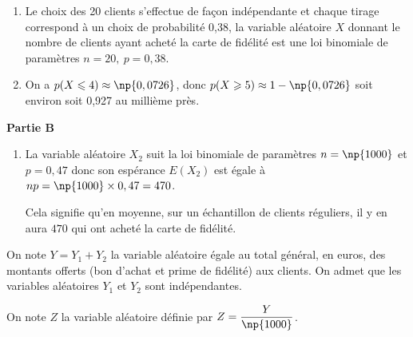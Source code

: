 \begin{enumerate}
	\begin{enumerate}
		\item 
	Le choix des 20 clients s'effectue de façon indépendante  et chaque tirage correspond à un choix de probabilité 0,38, la variable aléatoire $X$ donnant le nombre de clients ayant acheté la carte de fidélité est une loi binomiale de paramètres $n = 20, \:p = 0,38$.
		\item 
		On a $p(X \leqslant 4) \approx \np{0,0726}$, donc $p(X \geqslant 5) \approx 1 - \np{0,0726}$ soit environ  soit 0,927 au millième près.
	\end{enumerate}
\end{enumerate}

\medskip

\textbf{Partie B}

\medskip


















\medskip

\begin{enumerate}
\item 
La variable aléatoire $X_2$ suit la loi binomiale de paramètres $n=\np{1000}$ et $p=0,47$ donc son espérance $E(X_2)$ est égale à $np=\np{1000}\times 0,47=470$.

Cela signifie qu'en moyenne, sur un échantillon de  clients réguliers, il y en aura $470$ qui ont acheté la carte de fidélité.
\end{enumerate}

On note $Y = Y_1 + Y_2$ la variable aléatoire égale au total général, en euros, des montants offerts (bon d'achat et prime de fidélité) aux  clients. On admet que les variables aléatoires $Y_1$ et $Y_2$ sont indépendantes.

On note $Z$ la variable aléatoire définie par $Z = \dfrac{Y}{\np{1000}}$.

